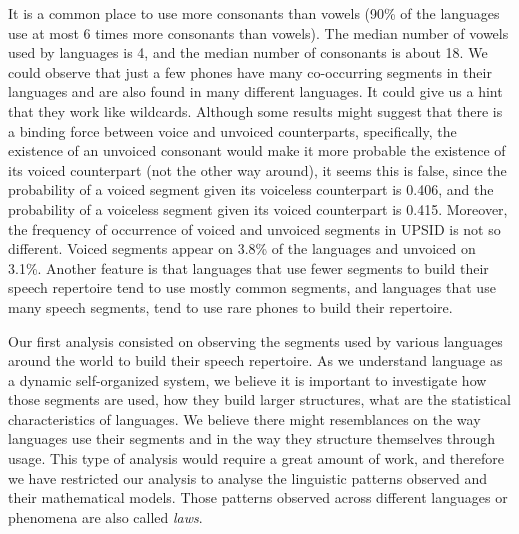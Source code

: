 It is a common place to use more consonants than vowels (90\% of the languages 
use at most 6 times more consonants than vowels). The median number of vowels used by
languages is 4, and the median number of consonants is about 18.
We could observe that just a few phones have many co-occurring segments in their 
languages and are also found in many different languages. It could give us a hint that 
they work like wildcards. Although some results might suggest that there is a binding 
force between voice and unvoiced counterparts, specifically, the existence of
an unvoiced consonant would make it more probable the existence of its voiced 
counterpart (not the other way around), it seems this is false, since 
the probability of a voiced segment given its voiceless counterpart is
0.406, and the probability of a voiceless segment given its voiced counterpart
is 0.415. Moreover, the frequency of occurrence of voiced and unvoiced segments
in UPSID is not so different. Voiced segments appear on 3.8\% of the languages
and unvoiced on 3.1\%. Another feature is that languages that use fewer 
segments to build their speech repertoire tend to use mostly common segments,
and languages that use many speech segments, tend to use rare phones to
build their repertoire.


Our first analysis consisted on observing the segments used by various languages around the
world to build their speech repertoire. As we understand language as a dynamic self-organized
system, we believe it is important to investigate how those segments are used, how they
build larger structures, what are the statistical characteristics of languages.
We believe there might resemblances on the way languages use their segments and in the way
they structure themselves through usage. This type of analysis would require a great amount
of work, and therefore we have restricted our analysis to analyse the linguistic patterns
observed and their mathematical models. Those patterns observed across different languages
or phenomena are also called \emph{laws}.

